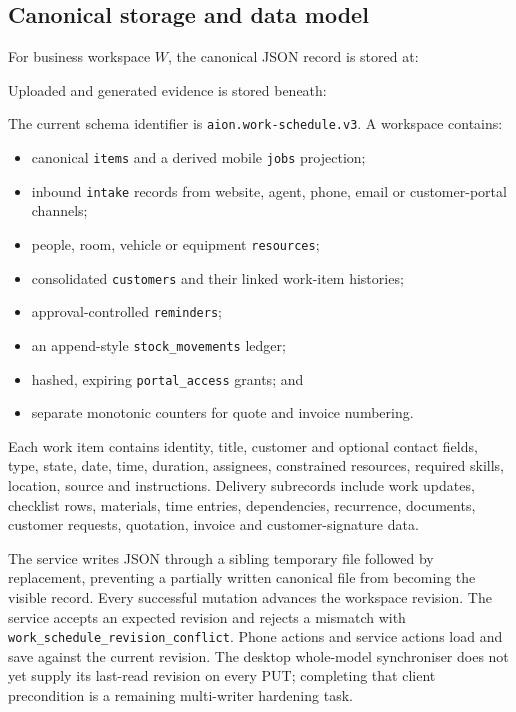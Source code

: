 \subsection{Canonical storage and data model}

For business workspace $W$, the canonical JSON record is stored at:
\begin{center}\small
{}
\end{center}
Uploaded and generated evidence is stored beneath:
\begin{center}\small
{}
\end{center}
The current schema identifier is
\texttt{aion.work-schedule.v3}.  A workspace contains:
\begin{itemize}[leftmargin=*]
  \item canonical \texttt{items} and a derived mobile \texttt{jobs} projection;
  \item inbound \texttt{intake} records from website, agent, phone, email or
        customer-portal channels;
  \item people, room, vehicle or equipment \texttt{resources};
  \item consolidated \texttt{customers} and their linked work-item histories;
  \item approval-controlled \texttt{reminders};
  \item an append-style \texttt{stock\_movements} ledger;
  \item hashed, expiring \texttt{portal\_access} grants; and
  \item separate monotonic counters for quote and invoice numbering.
\end{itemize}

Each work item contains identity, title, customer and optional contact fields,
type, state, date, time, duration, assignees, constrained resources, required
skills, location, source and instructions.  Delivery subrecords include work
updates, checklist rows, materials, time entries, dependencies, recurrence,
documents, customer requests, quotation, invoice and customer-signature data.

The service writes JSON through a sibling temporary file followed by replacement,
preventing a partially written canonical file from becoming the visible record.
Every successful mutation advances the workspace revision.  The service accepts
an expected revision and rejects a mismatch with
\texttt{work\_schedule\_revision\_conflict}.  Phone actions and service actions
load and save against the current revision.  The desktop whole-model synchroniser
does not yet supply its last-read revision on every PUT; completing that client
precondition is a remaining multi-writer hardening task.

